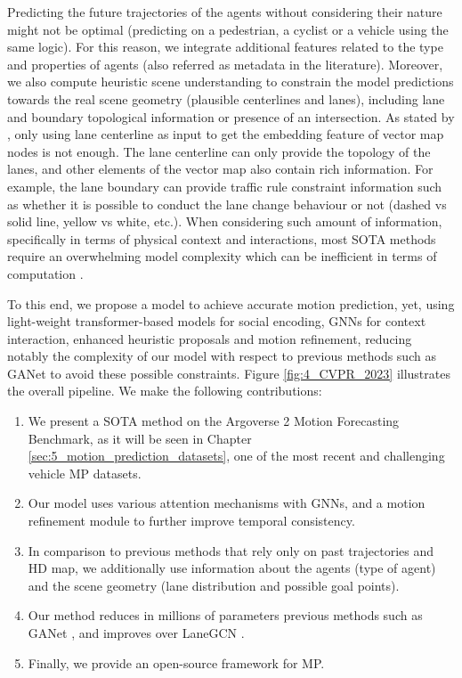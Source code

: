 Predicting the future trajectories of the agents without considering their nature might not be optimal (\eg predicting on a pedestrian, a cyclist or a vehicle using the same logic). For this reason, we integrate additional features related to the type and properties of agents (also referred as metadata in the literature). Moreover, we also compute heuristic scene understanding to constrain the model predictions towards the real scene geometry (\eg plausible centerlines and lanes), including lane and boundary topological information or presence of an intersection. 
As stated by \cite{zhang2022banet}, only using lane centerline as input to get the embedding feature of vector map nodes is not enough. The lane centerline can only provide the
topology of the lanes, and other elements of the vector map also contain rich information. For example, the lane boundary can provide traffic rule constraint information such as whether it is possible to conduct the lane change behaviour or not (dashed vs solid line, yellow vs white, etc.). When considering such amount of information, specifically in terms of physical context and interactions, most \ac{SOTA} methods require an overwhelming model complexity which can be inefficient in terms of computation \cite{gao2020vectornet, walters2020trajectory, can2022maps}.

To this end, we propose a model \cite{gomez2023improving} to achieve accurate motion prediction, yet, using light-weight transformer-based models for social encoding, \acp{GNN} for context interaction, enhanced heuristic proposals and motion refinement, reducing notably the complexity of our model with respect to previous methods such as GANet \cite{wang2022ganet} to avoid these possible constraints. Figure \ref{fig:4_CVPR_2023} illustrates the overall pipeline. We make the following contributions:

\begin{enumerate}
	\item We present a \ac{SOTA} method on the Argoverse 2 Motion Forecasting Benchmark, as it will be seen in Chapter \ref{sec:5_motion_prediction_datasets}, one of the most recent and challenging vehicle \ac{MP} datasets.
	\item Our model uses various attention mechanisms with GNNs, and a motion refinement module to further improve temporal consistency.
	\item In comparison to previous methods that rely only on past trajectories and HD map, we additionally use information about the agents (\eg type of agent) and the scene geometry (\eg lane distribution and possible goal points).
	\item Our method reduces in millions of parameters previous methods such as GANet \cite{wang2022ganet}, and improves over LaneGCN \cite{liang2020learning}.
	\item Finally, we provide an open-source framework for MP.
\end{enumerate}

